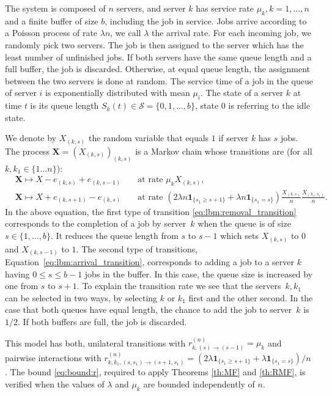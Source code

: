 \documentclass[acmsmall]{acmart}
\newcommand\bX{\mathbf{X}}
\newcommand\calS{\mathcal{S}}
\newcommand\toN{^{(n)}}
\begin{document}
The system is composed of $n$ servers, and server $k$ has service rate $\mu_k, k=1,\ldots,n$ and a finite buffer of size $b$, including the job in service. Jobs arrive according to a Poisson process of rate $\lambda n$, we call $\lambda$ the arrival rate. For each incoming job, we randomly pick two servers. The job is then assigned to the server which has the least number of unfinished jobs. If both servers have the same queue length and a full buffer, the job is discarded. Otherwise, at equal queue length, the assignment between the two servers is done at random. The service time of a job in the queue of server $i$ is exponentially distributed with mean $\mu_i$. The state of a server $k$ at time $t$ is its queue length $S_k(t) \in \calS= \{0,1,\ldots, b\}$, state $0$ is referring to the idle state. 

We denote by $X_{(k,s)}$ the random variable that equals $1$ if server $k$ has $s$ jobs. The process $\bX=(X_{(k,s)})_{(k,s)}$ is a Markov chain whose transitions are (for all $k,k_1\in\{1\dots n\}$):
\begin{subequations}
  \begin{align}
    &\bX \mapsto X - e_{(k,s)} + e_{(k,s-1)} && \text{ at rate } \mu_k X_{(k,s)}, \label{eq:lbm:removal_transition}\\
    &\bX \mapsto X + e_{(k,s+1)} - e_{(k,s)} && \text{ at rate } (2\lambda n \mathbf{1}_{\{s_1 \geq s+1\}} +  \lambda n \mathbf{1}_{\{s_1 = s\}}) \frac{X_{(k,s)}}{n} \frac{X_{(k_1,s_1)}}{n}. \label{eq:lbm:arrival_transition}
  \end{align}
\end{subequations}
In the above equation, the first type of transition \eqref{eq:lbm:removal_transition} corresponds to the completion of a job by server~$k$ when the queue is of size $s\in\{1,\dots,b\}$. It reduces the queue length from $s$ to $s-1$ which sets $X_{(k,s)}$ to $0$ and $X_{(k,s-1)}$ to $1$. The second type of transitions, Equation~\eqref{eq:lbm:arrival_transition}, corresponds to adding a job to a server $k$ having $0 \leq s \leq b-1$ jobs in the buffer. In this case, the queue size is increased by one from $s$ to $s+1$. To explain the transition rate we see that the servers~$k, k_1$ can be selected in two ways, by selecting $k$ or $k_1$ first and the other second. In the case that both queues have equal length, the chance to add the job to server~$k$ is $1/2$. If both buffers are full, the job is discarded. 

This model has both, unilateral transitions with $r_{k,(s) \rightarrow (s-1)}\toN = \mu_k$ and pairwise interactions with $r_{k,k_1,(s,s_1)\rightarrow (s+1,s_1)}\toN = (2\lambda \mathbf{1}_{\{s_1 \geq s+1\}} +  \lambda \mathbf{1}_{\{s_1 = s\}})/n$. The bound \eqref{eq:bound:r}, required to apply Theorems \ref{th:MF} and \ref{th:RMF}, is verified when the values of $\lambda$ and $\mu_k$ are bounded independently of $n$. 
\end{document}
